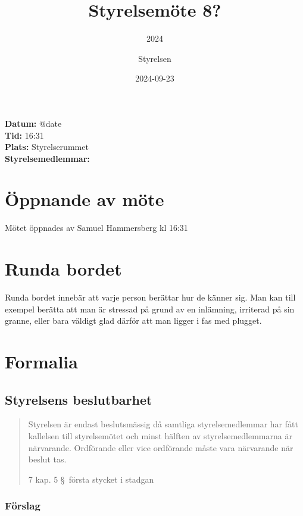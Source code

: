 \documentclass[protokoll]{dvd}
\begin{document}
\title{Styrelsemöte 8?}
\subtitle{2024}
\author{Styrelsen}
\date{2024-09-23}


\textbf{Datum:} \csname @date\endcsname\\
\textbf{Tid:} 16:31\\
\textbf{Plats:} Styrelserummet\\
\textbf{Styrelsemedlemmar:}
\begin{närvarande_förtroendevalda}
\end{närvarande_förtroendevalda}

\section{Öppnande av möte}

Mötet öppnades av Samuel Hammersberg kl 16:31

\section{Runda bordet}

Runda bordet innebär att varje person berättar hur de känner sig.
Man kan till exempel berätta att man är stressad på grund av en inlämning, irriterad på sin granne, eller bara väldigt glad därför att man ligger i fas med plugget.

\section{Formalia}

\subsection{Styrelsens beslutbarhet}

\blockquote[7 kap. 5 \S~första stycket i stadgan][]{%
    Styrelsen är endast beslutsmässig då samtliga styrelsemedlemmar har fått kallelsen till styrelsemötet och minst hälften av styrelsemedlemmarna är närvarande.
    Ordförande eller vice ordförande måste vara närvarande när beslut tas.
}

\subsubsection*{Förslag}
\end{document}
